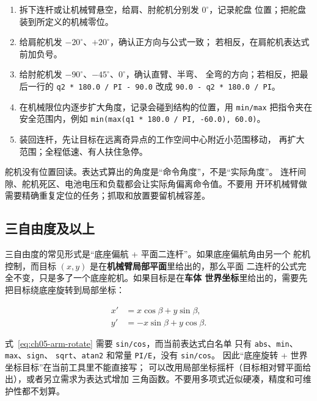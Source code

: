 \begin{enumerate}
  \item 拆下连杆或让机械臂悬空，给肩、肘舵机分别发 $0^\circ$，记录舵盘
        位置；把舵盘装到所定义的机械零位。
  \item 给肩舵机发 $-20^\circ$、$+20^\circ$，确认正方向与公式一致；
        若相反，在肩舵机表达式前加负号。
  \item 给肘舵机发 $-90^\circ$、$-45^\circ$、$0^\circ$，确认直臂、半弯、
        全弯的方向；若相反，把最后一行的 \texttt{q2 * 180.0 / PI - 90.0}
        改成 \texttt{90.0 - q2 * 180.0 / PI}。
  \item 在机械限位内逐步扩大角度，记录会碰到结构的位置，用
        \texttt{min/max} 把指令夹在安全范围内，例如
        \texttt{min(max(q1 * 180.0 / PI, -60.0), 60.0)}。
  \item 装回连杆，先让目标在远离奇异点的工作空间中心附近小范围移动，
        再扩大范围；全程低速、有人扶住急停。
\end{enumerate}

\begin{note}
舵机没有位置回读。表达式算出的角度是“命令角度”，不是“实际角度”。
连杆间隙、舵机死区、电池电压和负载都会让实际角偏离命令值。不要用
开环机械臂做需要精确重复定位的任务；抓取和放置要留机械容差。
\end{note}

\subsection{三自由度及以上}

三自由度的常见形式是“底座偏航 + 平面二连杆”。如果底座偏航角由另一个
舵机控制，而目标 $(x,y)$ 是在\textbf{机械臂局部平面}里给出的，那么平面
二连杆的公式完全不变，只是多了一个底座舵机。如果目标是在\textbf{车体
世界坐标}里给出的，需要先把目标绕底座旋转到局部坐标：

\begin{equation}
\begin{aligned}
x' &= x\cos\beta+y\sin\beta,\\
y' &= -x\sin\beta+y\cos\beta.
\end{aligned}
\label{eq:ch05-arm-rotate}
\end{equation}

式~\eqref{eq:ch05-arm-rotate} 需要 \texttt{sin/cos}，而当前表达式白名单
只有 \texttt{abs}、\texttt{min}、\texttt{max}、\texttt{sign}、
\texttt{sqrt}、\texttt{atan2} 和常量 \texttt{PI/E}，没有 \texttt{sin/cos}。
因此“底座旋转 + 世界坐标目标”在当前工具里不能直接写；
可以改用局部坐标摇杆（目标相对臂平面给出），或者另立需求为表达式增加
三角函数。不要用多项式近似硬凑，精度和可维护性都不划算。

